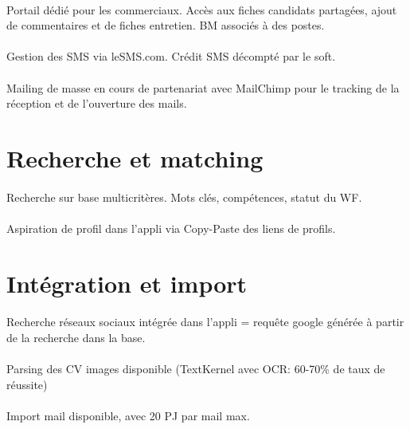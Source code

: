 \paragraph{} Portail dédié pour les commerciaux. Accès aux fiches candidats partagées, ajout de commentaires et de fiches entretien. BM associés à des postes.
\paragraph{} Gestion des SMS via leSMS.com. Crédit SMS décompté par le soft.
\paragraph{} Mailing de masse en cours de partenariat avec MailChimp pour le tracking de la réception et de l'ouverture des mails.



\section{Recherche et matching}
\paragraph{} Recherche sur base multicritères. Mots clés, compétences, statut du WF.
\paragraph{} Aspiration de profil  dans l'appli via Copy-Paste des liens de profils.


\section{Intégration et import}

\paragraph{} Recherche réseaux sociaux intégrée dans l'appli = requête google générée à partir de la recherche dans la base.
\paragraph{} Parsing des CV images disponible (TextKernel avec OCR: 60-70\% de taux de réussite)
\paragraph{} Import mail disponible, avec 20 PJ par mail max.
